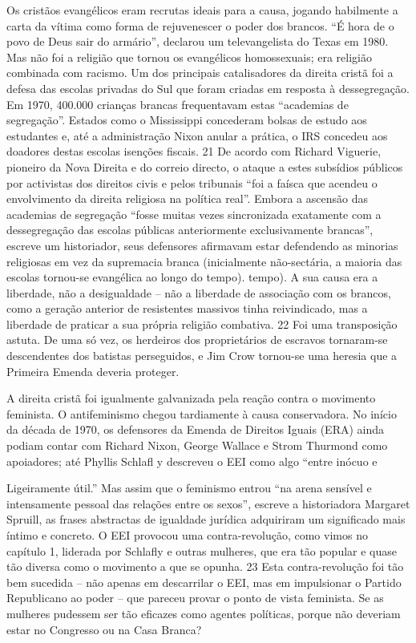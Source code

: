 Os cristãos evangélicos eram recrutas ideais para a causa, jogando habilmente a carta da vítima como forma de rejuvenescer o poder dos brancos. “É hora de o povo de Deus sair do armário”, declarou um televangelista do Texas em 1980. Mas não foi a religião que tornou os evangélicos homossexuais; era religião combinada com racismo. Um dos principais catalisadores da direita cristã foi a defesa das escolas privadas do Sul que foram criadas em resposta à dessegregação. Em 1970, {\color{blue}400}.000 crianças brancas frequentavam estas “academias de segregação”. Estados como o Mississippi concederam bolsas de estudo aos estudantes e, até a administração Nixon anular a prática, o IRS concedeu aos doadores destas escolas isenções fiscais. {\color{blue}21} De acordo com Richard Viguerie, pioneiro da Nova Direita e do correio directo, o ataque a estes subsídios públicos por activistas dos direitos civis e pelos tribunais “foi a faísca que acendeu o envolvimento da direita religiosa na política real”. Embora a ascensão das academias de segregação “fosse muitas vezes sincronizada exatamente com a dessegregação das escolas públicas anteriormente exclusivamente brancas”, escreve um historiador, seus defensores afirmavam estar defendendo as minorias religiosas em vez da supremacia branca (inicialmente não-sectária, a maioria das escolas tornou-se evangélica ao longo do tempo). tempo). A sua causa era a liberdade, não a desigualdade – não a liberdade de associação com os brancos, como a geração anterior de resistentes massivos tinha reivindicado, mas a liberdade de praticar a sua própria religião combativa. {\color{blue}22} Foi uma transposição astuta. De uma só vez, os herdeiros dos proprietários de escravos tornaram-se descendentes dos batistas perseguidos, e Jim Crow tornou-se uma heresia que a Primeira Emenda deveria proteger.
 \par 
A direita cristã foi igualmente galvanizada pela reação contra o movimento feminista. O antifeminismo chegou tardiamente à causa conservadora. No início da década de 1970, os defensores da Emenda de Direitos Iguais (ERA) ainda podiam contar com Richard Nixon, George Wallace e Strom Thurmond como apoiadores; até Phyllis Schlafl y descreveu o EEI como algo “entre inócuo e
 \par 
Ligeiramente útil.” Mas assim que o feminismo entrou “na arena sensível e intensamente pessoal das relações entre os sexos”, escreve a historiadora Margaret Spruill, as frases abstractas de igualdade jurídica adquiriram um significado mais íntimo e concreto. O EEI provocou uma contra-revolução, como vimos no capítulo 1, liderada por Schlafly e outras mulheres, que era tão popular e quase tão diversa como o movimento a que se opunha. {\color{blue}23} Esta contra-revolução foi tão bem sucedida – não apenas em descarrilar o EEI, mas em impulsionar o Partido Republicano ao poder – que pareceu provar o ponto de vista feminista. Se as mulheres pudessem ser tão eficazes como agentes políticas, porque não deveriam estar no Congresso ou na Casa Branca?
